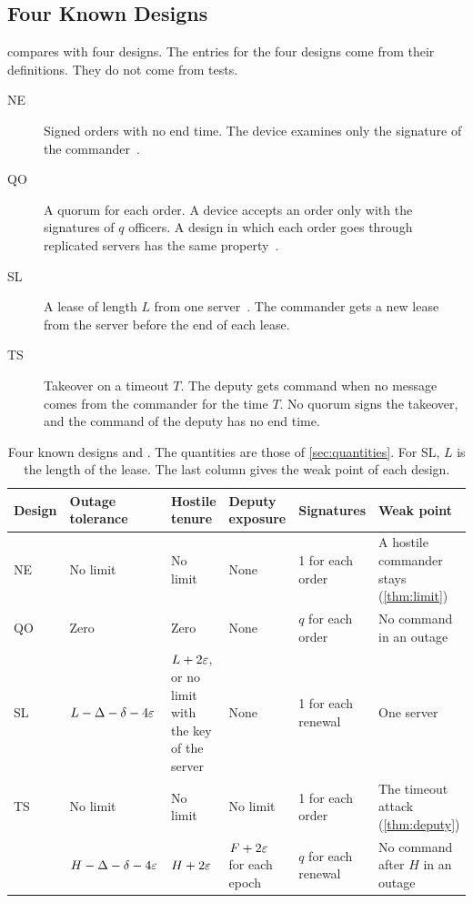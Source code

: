 \subsection{Four Known Designs}

 compares \sys{} with four designs. The entries for the four designs come
from their definitions. They do not come from tests.

\begin{description}
  \item[NE] Signed orders with no end time. The device examines only the signature of the
  commander~\cite{saxena2018signature}.
  \item[QO] A quorum for each order. A device accepts an order only with the signatures of
  $q$ officers. A design in which each order goes through replicated servers has the same
  property~\cite{babay2018spire}.
  \item[SL] A lease of length $L$ from one server~\cite{gray1989leases}. The commander
  gets a new lease from the server before the end of each lease.
  \item[TS] Takeover on a timeout $T$. The deputy gets command when no message comes from
  the commander for the time $T$. No quorum signs the takeover, and the command of the
  deputy has no end time.
\end{description}

\begin{table}[t]
\caption{Four known designs and \sys{}. The quantities are those of
\cref{sec:quantities}. For SL, $L$ is the length of the lease. The last column gives the
weak point of each design.}
\label{tab:designs}
\centering
\small
\begin{tabularx}{\textwidth}{@{}ll>{\raggedright\arraybackslash}X>{\raggedright\arraybackslash}p{}l>{\raggedright\arraybackslash}X@{}}
\toprule
Design & Outage tolerance & Hostile tenure & Deputy exposure & Signatures & Weak point \\
\midrule
NE & No limit & No limit & None & 1 for each order & A hostile commander stays (\cref{thm:limit}) \\
QO & Zero & Zero & None & $q$ for each order & No command in an outage \\
SL & $L - \Delta - \delta - 4\varepsilon$ & $L + 2\varepsilon$, or no limit with the key of the server & None & 1 for each renewal & One server \\
TS & No limit & No limit & No limit & 1 for each order & The timeout attack (\cref{thm:deputy}) \\
\sys{} & $H - \Delta - \delta - 4\varepsilon$ & $H + 2\varepsilon$ & $F + 2\varepsilon$ for each epoch & $q$ for each renewal & No command after $H$ in an outage \\
\bottomrule
\end{tabularx}
\end{table}

